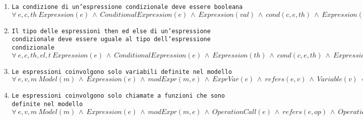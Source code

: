 
\begin{enumerate}
	\item \texttt{La condizione di un'espressione condizionale deve essere booleana} \\
		  $\forall \ e,c,th \ Expression(e) \ \land \ ConditionalExpression(e) \ \land \ Expression(val) \ \land \ cond(c, e, th) \ \land \ Expression(c) \ \Rightarrow \ typeExpr(Boolean, c)$ \\
	\item \texttt{Il tipo delle espressioni then ed else di un'espressione condizionale deve essere uguale al tipo dell'espressione condizionale} \\
		  $\forall \ e,c,th,el,t \ Expression(e) \ \land \ ConditionalExpression(e) \ \land \ Expression(th) \ \land \ cond(c, e, th) \ \land \ Expression(c) \ \land \ else(e, el) \ \land \ Expression(el) \  \land typeExpr(t, e) \ \land \ Type(t) \ \Rightarrow \ typeExpr(t, th) \ \land \ typeExpr(t, el)$ \\
	\item \texttt{Le espressioni coinvolgono solo variabili definite nel modello} \\
		  $\forall \ e,v,m \ Model(m) \ \land \ Expression(e) \ \land \ modExpr(m, e) \ \land \ ExprVar(e) \ \land \ refers(e,v) \ \land \ Variable(v) \ \Rightarrow \ modVar(m, v)$ \\
	\item \texttt{Le espressioni coinvolgono solo chiamate a funzioni che sono definite nel modello} \\
		  $\forall \ e,v,m \ Model(m) \ \land \ Expression(e) \ \land \ modExpr(m, e) \ \land \ OperationCall(e) \ \land \ refers(e,op) \ \land \ Operation(op) \ \Rightarrow \ modOp(m, op)$ \\
\end{enumerate}